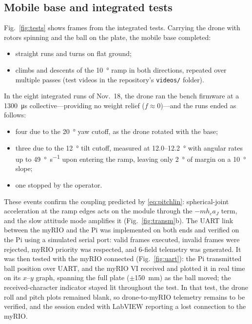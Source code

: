\subsection{Mobile base and integrated tests}
\label{sec:integrated}
Fig.~\ref{fig:tests} shows frames from the integrated tests. Carrying the drone with rotors spinning and the ball on the plate, the mobile base completed:
\begin{itemize}
  \item straight runs and turns on flat ground;
  \item climbs and descents of the \SI{10}{\degree} ramp in both directions, repeated over multiple passes (test videos in the repository's \texttt{videos/} folder).
\end{itemize}
In the eight integrated runs of Nov.~18, the drone ran the bench firmware at a \SI{1300}{\micro\second} collective---providing no weight relief ($f\approx0$)---and the runs ended as follows:
\begin{itemize}
  \item four due to the \SI{20}{\degree} yaw cutoff, as the drone rotated with the base;
  \item three due to the \SI{12}{\degree} tilt cutoff, measured at 12.0--\SI{12.2}{\degree} with angular rates up to \SI{49}{\degree\per\second} upon entering the ramp, leaving only \SI{2}{\degree} of margin on a \SI{10}{\degree} slope;
  \item one stopped by the operator.
\end{itemize}
These events confirm the coupling predicted by \eqref{eq:pitchlin}: spherical-joint acceleration at the ramp edges acts on the module through the $-mh_ca_J$ term, and the slow attitude mode amplifies it (Fig.~\ref{fig:transm}b). The UART link between the myRIO and the Pi was implemented on both ends and verified on the Pi using a simulated serial port: valid frames executed, invalid frames were rejected, myRIO priority was respected, and 6-field telemetry was generated. It was then tested with the myRIO connected (Fig.~\ref{fig:uart}): the Pi transmitted ball position over UART, and the myRIO VI received and plotted it in real time on its $x$--$y$ graph, spanning the full plate ($\pm$\SI{150}{\milli\metre}) as the ball moved; the received-character indicator stayed lit throughout the test. In that test, the drone roll and pitch plots remained blank, so drone-to-myRIO telemetry remains to be verified, and the session ended with LabVIEW reporting a lost connection to the myRIO.

